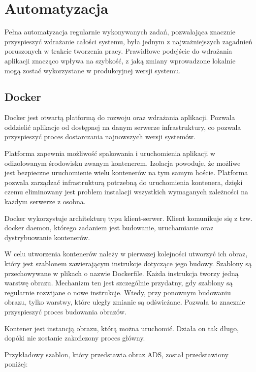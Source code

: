 \newpage
\section{Automatyzacja}

Pełna automatyzacja regularnie wykonywanych zadań, pozwalająca znacznie przyspieszyć 
wdrażanie całości systemu, była jednym z najważniejszych zagadnień poruszonych w 
trakcie tworzenia pracy. Prawidłowe podejście do wdrażania aplikacji znacząco wpływa 
na szybkość, z jaką zmiany wprowadzone lokalnie mogą zostać wykorzystane w 
produkcyjnej wersji systemu. 

\subsection{Docker}

Docker jest otwartą platformą do rozwoju oraz wdrażania aplikacji. Pozwala oddzielić aplikacje od
dostępnej na danym serwerze infrastruktury, co pozwala przyspieszyć proces dostarczania najnowszych
wersji systemów. 

Platforma zapewnia możliwość spakowania i uruchomienia aplikacji w odizolowanym środowisku
zwanym kontenerem. Izolacja powoduje, że możliwe jest bezpieczne uruchomienie wielu kontenerów na tym
samym hoście. Platforma pozwala zarządzać infrastrukturą potrzebną do uruchomienia kontenera, dzięki
czemu eliminowany jest problem instalacji wszystkich wymaganych zależności na każdym serwerze z osobna.

Docker wykorzystuje architekturę typu klient-serwer. Klient komunikuje się z tzw. docker daemon, którego
zadaniem jest budowanie, uruchamianie oraz dystrybuowanie kontenerów. 

W celu utworzenia kontenerów należy w pierwszej kolejności utworzyć ich obraz, który jest szablonem
zawierającym instrukcje dotyczące jego budowy. Szablony są przechowywane w plikach o nazwie Dockerfile.
Każda instrukcja tworzy jedną warstwę obrazu. Mechanizm ten jest szczególnie przydatny, gdy szablony są
regularnie rozwijane o nowe instrukcje. Wtedy, przy ponownym budowaniu obrazu, tylko warstwy, które
uległy zmianie są odświeżane. Pozwala to znacznie przyspieszyć proces budowania obrazów.

Kontener jest instancją obrazu, którą można uruchomić. Działa on tak długo, dopóki nie zostanie
zakończony proces główny.

Przykładowy szablon, który przedstawia obraz ADS, został przedstawiony poniżej:

